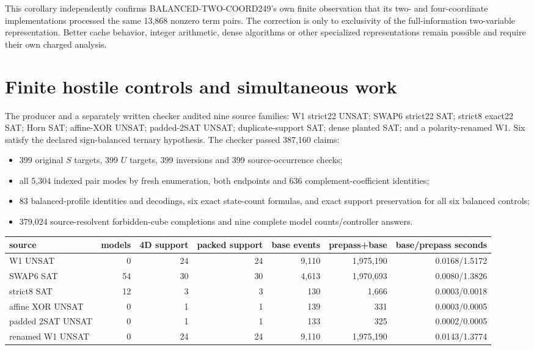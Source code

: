 \documentclass[10pt]{article}
\begin{document}
This corollary independently confirms BALANCED-TWO-COORD249's own finite
observation that its two- and four-coordinate implementations processed the
same 13,868 nonzero term pairs.  The correction is only to exclusivity of the
full-information two-variable representation.  Better cache behavior,
integer arithmetic, dense algorithms or other specialized representations
remain possible and require their own charged analysis.

\section{Finite hostile controls and simultaneous work}
The producer and a separately written checker audited nine source families:
W1 strict22 UNSAT; SWAP6 strict22 SAT; strict8 exact22 SAT; Horn SAT;
affine-XOR UNSAT; padded-2SAT UNSAT; duplicate-support SAT; dense planted SAT;
and a polarity-renamed W1.  Six satisfy the declared sign-balanced ternary
hypothesis.  The checker passed 387,160 claims:
\begin{itemize}
\item 399 original $S$ targets, 399 $U$ targets, 399 inversions and 399
source-occurrence checks;
\item all 5,304 indexed pair modes by fresh enumeration, both endpoints and
636 complement-coefficient identities;
\item 83 balanced-profile identities and decodings, six exact state-count
formulas, and exact support preservation for all six balanced controls;
\item 379,024 source-resolvent forbidden-cube completions and nine complete
model counts/controller answers.
\end{itemize}

\begin{center}\small
\begin{tabular}{lrrrrrr}
\toprule
source&models&4D support&packed support&base events&prepass+base&base/prepass seconds\\
\midrule
W1 UNSAT&0&24&24&9,110&1,975,190&0.0168/1.5172\\
SWAP6 SAT&54&30&30&4,613&1,970,693&0.0080/1.3826\\
strict8 SAT&12&3&3&130&1,666&0.0003/0.0018\\
affine XOR UNSAT&0&1&1&139&331&0.0003/0.0005\\
padded 2SAT UNSAT&0&1&1&133&325&0.0002/0.0005\\
renamed W1 UNSAT&0&24&24&9,110&1,975,190&0.0143/1.3774\\
\bottomrule
\end{tabular}
\end{center}
\end{document}
